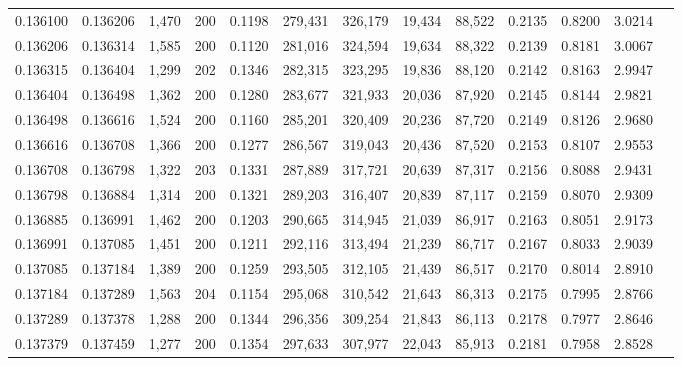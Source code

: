 \begin{tabular}{rrrrrrrrrrrrr}
0.136100 & 0.136206 &  1,470 & 200 &                                     0.1198 & 279,431 & 326,179 &  19,434 &  88,522 & 0.2135 & 0.8200 & 3.0214 \\
0.136206 & 0.136314 &  1,585 & 200 &                                     0.1120 & 281,016 & 324,594 &  19,634 &  88,322 & 0.2139 & 0.8181 & 3.0067 \\
0.136315 & 0.136404 &  1,299 & 202 &                                     0.1346 & 282,315 & 323,295 &  19,836 &  88,120 & 0.2142 & 0.8163 & 2.9947 \\
0.136404 & 0.136498 &  1,362 & 200 &                                     0.1280 & 283,677 & 321,933 &  20,036 &  87,920 & 0.2145 & 0.8144 & 2.9821 \\
0.136498 & 0.136616 &  1,524 & 200 &                                     0.1160 & 285,201 & 320,409 &  20,236 &  87,720 & 0.2149 & 0.8126 & 2.9680 \\
0.136616 & 0.136708 &  1,366 & 200 &                                     0.1277 & 286,567 & 319,043 &  20,436 &  87,520 & 0.2153 & 0.8107 & 2.9553 \\
0.136708 & 0.136798 &  1,322 & 203 &                                     0.1331 & 287,889 & 317,721 &  20,639 &  87,317 & 0.2156 & 0.8088 & 2.9431 \\
0.136798 & 0.136884 &  1,314 & 200 &                                     0.1321 & 289,203 & 316,407 &  20,839 &  87,117 & 0.2159 & 0.8070 & 2.9309 \\
0.136885 & 0.136991 &  1,462 & 200 &                                     0.1203 & 290,665 & 314,945 &  21,039 &  86,917 & 0.2163 & 0.8051 & 2.9173 \\
0.136991 & 0.137085 &  1,451 & 200 &                                     0.1211 & 292,116 & 313,494 &  21,239 &  86,717 & 0.2167 & 0.8033 & 2.9039 \\
0.137085 & 0.137184 &  1,389 & 200 &                                     0.1259 & 293,505 & 312,105 &  21,439 &  86,517 & 0.2170 & 0.8014 & 2.8910 \\
0.137184 & 0.137289 &  1,563 & 204 &                                     0.1154 & 295,068 & 310,542 &  21,643 &  86,313 & 0.2175 & 0.7995 & 2.8766 \\
0.137289 & 0.137378 &  1,288 & 200 &                                     0.1344 & 296,356 & 309,254 &  21,843 &  86,113 & 0.2178 & 0.7977 & 2.8646 \\
0.137379 & 0.137459 &  1,277 & 200 &                                     0.1354 & 297,633 & 307,977 &  22,043 &  85,913 & 0.2181 & 0.7958 & 2.8528 \\

\end{tabular}
